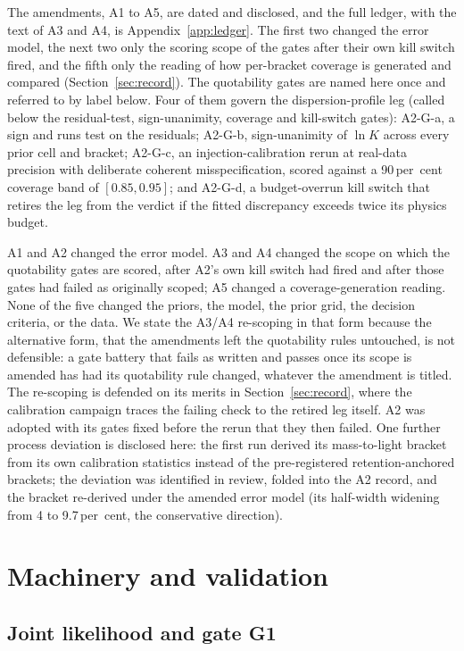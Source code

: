 \documentclass[11pt]{article}
\newcommand{\lnK}{\ensuremath{\ln K}}
\begin{document}
The amendments, A1 to A5, are dated and disclosed, and the full ledger, with the text of A3 and A4, is Appendix~\ref{app:ledger}. The first two changed the error model, the next two only the scoring scope of the gates after their own kill switch fired, and the fifth only the reading of how per-bracket coverage is generated and compared (Section~\ref{sec:record}). The quotability gates are named here once and referred to by label below. Four of them govern the dispersion-profile leg (called below the residual-test, sign-unanimity, coverage and kill-switch gates): A2-G-a, a sign and runs test on the residuals; A2-G-b, sign-unanimity of \lnK{} across every prior cell and bracket; A2-G-c, an injection-calibration rerun at real-data precision with deliberate coherent misspecification, scored against a 90\,per~cent coverage band of $[0.85, 0.95]$; and A2-G-d, a budget-overrun kill switch that retires the leg from the verdict if the fitted discrepancy exceeds twice its physics budget.

A1 and A2 changed the error model. A3 and A4 changed the scope on which the quotability gates are scored, after A2's own kill switch had fired and after those gates had failed as originally scoped; A5 changed a coverage-generation reading. None of the five changed the priors, the model, the prior grid, the decision criteria, or the data. We state the A3/A4 re-scoping in that form because the alternative form, that the amendments left the quotability rules untouched, is not defensible: a gate battery that fails as written and passes once its scope is amended has had its quotability rule changed, whatever the amendment is titled. The re-scoping is defended on its merits in Section~\ref{sec:record}, where the calibration campaign traces the failing check to the retired leg itself. A2 was adopted with its gates fixed before the rerun that they then failed. One further process deviation is disclosed here: the first run derived its mass-to-light bracket from its own calibration statistics instead of the pre-registered retention-anchored brackets; the deviation was identified in review, folded into the A2 record, and the bracket re-derived under the amended error model (its half-width widening from 4 to 9.7\,per~cent, the conservative direction).

\section{Machinery and validation}
\label{sec:machinery}

\subsection{Joint likelihood and gate G1}
\label{sec:g1}
\end{document}
